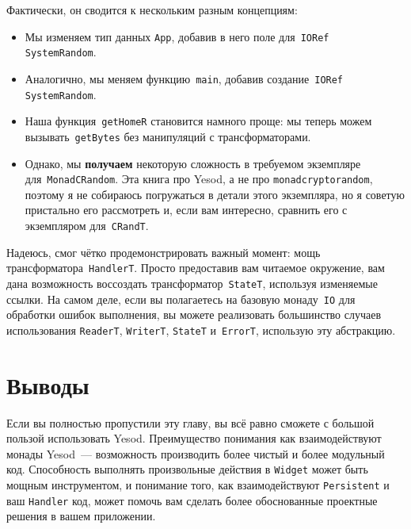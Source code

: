 Фактически, он сводится к нескольким разным концепциям:
\begin{itemize}
    \item Мы изменяем тип данных \lstinline'App', добавив в него поле
        для~\lstinline'IORef SystemRandom'.

    \item Аналогично, мы меняем функцию~\lstinline'main', добавив
        создание~\lstinline'IORef SystemRandom'.

    \item Наша функция~\lstinline'getHomeR' становится намного проще: мы теперь
        можем вызывать~\lstinline'getBytes' без манипуляций с трансформаторами.

    \item Однако, мы \textbf{получаем} некоторую сложность в требуемом
        экземпляре для~\lstinline'MonadCRandom'. Эта книга про Yesod, а не про
        \texttt{monadcryptorandom}, поэтому я не собираюсь погружаться в детали
        этого экземпляра, но я советую пристально его рассмотреть и, если вам
        интересно, сравнить его с экземпляром для~\lstinline'CRandT'.
\end{itemize}

Надеюсь, смог чётко продемонстрировать важный момент: мощь
трансформатора~\lstinline'HandlerT'. Просто предоставив вам читаемое окружение,
вам дана возможность воссоздать трансформатор~\lstinline'StateT', используя
изменяемые ссылки. На самом деле, если вы полагаетесь на базовую
монаду~\lstinline'IO' для обработки ошибок выполнения, вы можете реализовать
большинство случаев использования \lstinline'ReaderT', \lstinline'WriterT',
\lstinline'StateT' и~\lstinline'ErrorT', использую эту абстракцию.

\section{Выводы}
Если вы полностью пропустили эту главу, вы всё равно сможете с большой пользой
использовать Yesod. Преимущество понимания как взаимодействуют монады
Yesod~--- возможность производить более чистый и более модульный код. Способность
выполнять произвольные действия в \lstinline'Widget' может быть мощным инструментом, и
понимание того, как взаимодействуют \lstinline'Persistent' и ваш \lstinline'Handler' код,
может помочь вам сделать более обоснованные проектные решения в вашем приложении.

